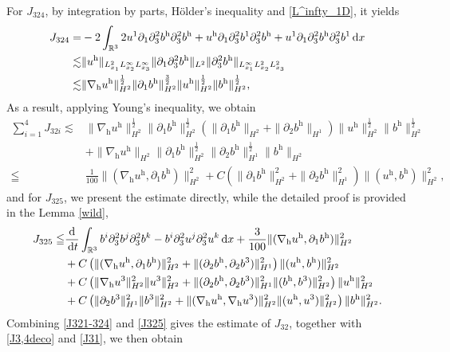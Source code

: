 \documentclass[11pt]{amsart}
\theoremstyle{definition}
\newcommand{\R}{\mathbb{R}}
\newcommand{\h}{\mathrm{h}}
\newcommand{\dx}{\,{\rm d}x}
\newcommand{\dt}{\,{\rm d}t}
\newcommand{\nablah}{\nabla_{\mathrm{h}}}
\numberwithin{equation}{section}
\begin{document}
For $J_{324}$, by integration by parts, H\"older's inequality and \eqref{L^infty_1D}, it yields
\begin{align*}
	J_{324}=&-2\int_{\R^3}2u^1\partial_1\partial_3^2b^\h\partial_{3}^2b^\h+u^\h\partial_1\partial_3^2b^1\partial_{3}^2b^\h+u^1\partial_1\partial_3^2b^\h\partial_{3}^2b^1\dx\\
	\lesssim&\| u^\h \|_{L^2_{x_1}L^\infty_{x_2}L^\infty_{x_3}}\|\partial_1\partial_3^2b^\h\|_{L^2}\|\partial_{3}^2b^\h \|_{L^\infty_{x_1}L^2_{x_2}L^2_{x_3}}\\
	\lesssim &\|\nabla_\mathrm{h} u^\mathrm{h}\|_{H^2}^\frac12\|\partial_1b^\h\|_{H^2}^\frac32\|u^\mathrm{h}\|_{H^2}^\frac12\| b^\h\|_{H^2}^\frac12,
\end{align*}
As a result, applying Young's inequality, we obtain
\begin{align}\label{J321-324}
	\sum_{i=1}^{4}J_{32i}\lesssim &\|\nabla_\mathrm{h} u^\mathrm{h}\|_{H^2}^\frac12\|\partial_1b^\h\|_{H^2}^\frac12\left(\|\partial_1 b^\h\|_{H^2}+\|\partial_2 b^\h\|_{H^1}\right)\|u^\mathrm{h}\|_{H^2}^\frac12\| b^\h\|_{H^2}^\frac12\nonumber\\
	&+\|\nablah u^\h\|_{H^2}\|\partial_1 b^\h\|_{H^2}^\frac12\|\partial_2 b^\h\|_{H^1}^\frac12\| b^\h\|_{H^2}\nonumber\\
	\leqq& \frac{1}{100}\|(\nabla_\h u^\h,\partial_1 b^\h)\|_{H^2}^2+C\left(\|\partial_1 b^\h\|_{H^2}^2+\|\partial_2 b^\h\|_{H^1}^2\right)\|(u^\h ,b^\h)\|_{H^2}^2,
\end{align}
and for $J_{325}$, we present the estimate directly, while the detailed proof is provided in the Lemma \ref{wild},
\begin{align}\label{J325}
	J_{325}\leqq&\frac{\mathrm{d}}{\dt}\int_{\R^3} b^i\partial_3^2b^j\partial_3^2b^k-b^i\partial_3^2u^j\partial_3^2u^k\dx+\frac{3}{100}\|(\nablah u^\h,\partial_1b^\h)\|_{H^2}^2\nonumber\\
	&+C\left(\|(\nablah u^\h,\partial_1b^\h)\|_{H^2}^2+\|(\partial_2b^\h,\partial_2b^3)\|_{H^1}^2\right)\|(u^\h,b^\h)\|_{H^2}^2\nonumber\\
	&+C\left(\|\nablah u^3\|_{H^2}^2\|u^3\|_{H^2}^2+ \|(\partial_2b^\h,\partial_2b^3)\|_{H^1}^2\|(b^\h,b^3)\|_{H^2}^2\right)\|u^\h\|_{H^2}^2\nonumber\\	&+C\left(\|\partial_2b^3\|_{H^1}^2\|b^3\|_{H^2}^2+\|(\nablah u^\h,\nablah u^3)\|_{H^2}^2\|(u^\h,u^3)\|_{H^2}^2\right)\|b^\h\|_{H^2}^2.
\end{align}
Combining \eqref{J321-324} and \eqref{J325} gives the estimate of $J_{32}$, together with \eqref{J3,4deco} and \eqref{J31}, we then obtain
\end{document}
